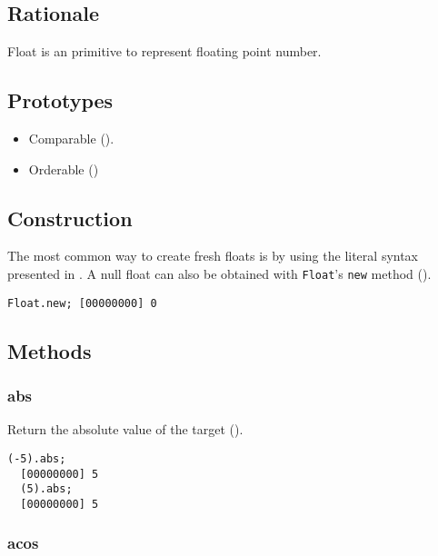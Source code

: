 
\subsection{Rationale}

Float is an \us primitive to represent floating point number.

\subsection{Prototypes}

\begin{itemize}
\item Comparable ().
\item Orderable ()
\end{itemize}

\subsection{Construction}

The most common way to create fresh floats is by using the literal
syntax presented in . A null float can also be
obtained with \lstinline|Float|'s \lstinline|new| method
().

\begin{lstlisting}[caption=Creating a new float, label=lst:new-float,
  float=\floatpos]
  Float.new; [00000000] 0
\end{lstlisting}

\subsection{Methods}


\subsubsection{abs}

Return the absolute value of the target ().

\begin{lstlisting}[caption=Float.abs, label=lst:float-abs,
  float=\floatposh]
  (-5).abs;
  [00000000] 5
  (5).abs;
  [00000000] 5
\end{lstlisting}

\subsubsection{acos}

